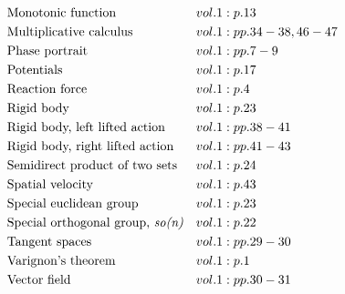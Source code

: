 \documentclass[a4paper]{article}
\begin{document}
\begin{align*}
&\text{Monotonic function}&& vol. 1: p. 13\\
&\text{Multiplicative calculus}&& vol. 1: pp. 34-38, 46-47\\
&\text{Phase portrait}&& vol. 1: pp. 7-9\\
&\text{Potentials}&& vol. 1: p. 17\\
&\text{Reaction force}&& vol. 1: p. 4\\
&\text{Rigid body}&& vol. 1: p. 23\\
&\text{Rigid body, left lifted action}&& vol. 1: pp. 38-41\\
&\text{Rigid body, right lifted action}&& vol. 1: pp. 41-43\\
&\text{Semidirect product of two sets}&& vol. 1: p. 24\\
&\text{Spatial velocity}&& vol. 1: p. 43\\
&\text{Special euclidean group}&& vol. 1: p. 23\\
&\text{Special orthogonal group, \emph{so(n)}}&& vol. 1: p. 22\\
&\text{Tangent spaces}&& vol. 1: pp. 29-30\\
&\text{Varignon's theorem}&& vol. 1: p. 1\\
&\text{Vector field}&& vol. 1: pp. 30-31\\
\end{align*} 
\end{document}
